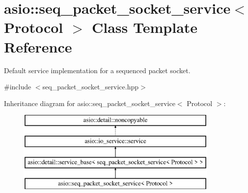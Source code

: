 \hypertarget{classasio_1_1seq__packet__socket__service}{}\section{asio\+:\+:seq\+\_\+packet\+\_\+socket\+\_\+service$<$ Protocol $>$ Class Template Reference}
\label{classasio_1_1seq__packet__socket__service}


Default service implementation for a sequenced packet socket.  




{\ttfamily \#include $<$seq\+\_\+packet\+\_\+socket\+\_\+service.\+hpp$>$}

Inheritance diagram for asio\+:\+:seq\+\_\+packet\+\_\+socket\+\_\+service$<$ Protocol $>$\+:\begin{figure}[H]
\begin{center}
\leavevmode
\includegraphics[height=4.000000cm]{classasio_1_1seq__packet__socket__service}
\end{center}
\end{figure}

